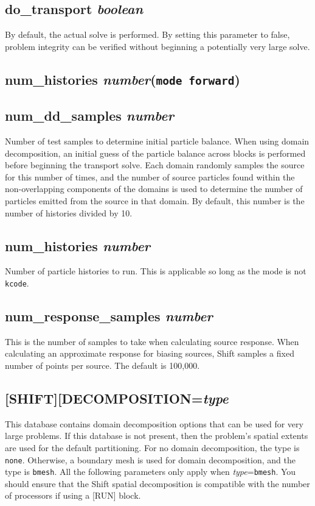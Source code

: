 \documentclass[10pt]{article}
\begin{document}
\subsection{do\_transport \textit{boolean}}
By default, the actual solve is performed. By setting this parameter to false, problem integrity can be verified without beginning a potentially very large solve. 

\subsection{num\_histories \textit{number}\quad\quad\quad(\texttt{mode forward})}

\subsection{num\_dd\_samples \textit{number}}
Number of test samples to determine initial particle balance. When using domain decomposition, an initial guess of the particle balance across blocks is performed before beginning the transport solve. Each domain randomly samples the source for this number of times, and the number of source particles found within the non-overlapping components of the domains is used to determine the number of particles emitted from the source in that domain. By default, this number is the number of histories divided by 10. 

\subsection{num\_histories \textit{number}}
Number of particle histories to run. This is applicable so long as the mode is not \texttt{kcode}.

\subsection{num\_response\_samples \textit{number}}
This is the number of samples to take when calculating source response. When calculating an approximate response for biasing sources, Shift samples a fixed number of points per source. The default is 100,000.

\subsection{[SHIFT][DECOMPOSITION=\textit{type}}
This database contains domain decomposition options that can be used for very large problems. If this database is not present, then the problem's spatial extents are used for the default partitioning. For no domain decomposition, the type is \texttt{none}. Otherwise, a boundary mesh is used for domain decomposition, and the type is \texttt{bmesh}. All the following parameters only apply when \textit{type}=\texttt{bmesh}. You should ensure that the Shift spatial decomposition is compatible with the number of processors if using a [RUN] block.
\end{document}
